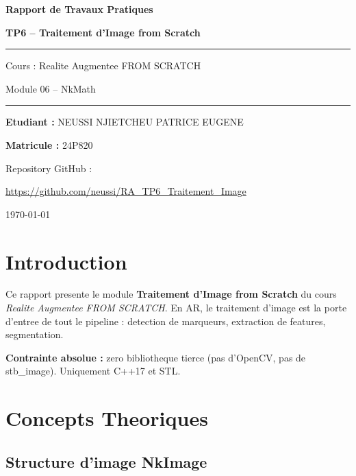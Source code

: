 \documentclass[12pt,a4paper]{article}
\begin{document}
\begin{titlepage}
    \centering
    \vspace*{2cm}
    {\huge\bfseries Rapport de Travaux Pratiques\par}
    \vspace{1cm}
    {\LARGE\bfseries\color{codeblue} TP6 -- Traitement d'Image from Scratch\par}
    \vspace{1.5cm}
    \rule{\linewidth}{0.5pt}\vspace{0.5cm}
    {\large Cours : Realite Augmentee FROM SCRATCH\par}
    {\large Module 06 -- NkMath\par}
    \vspace{0.5cm}\rule{\linewidth}{0.5pt}
    \vspace{2cm}
    {\large\textbf{Etudiant :} NEUSSI NJIETCHEU PATRICE EUGENE\par}
    {\large\textbf{Matricule :} 24P820\par}
    \vspace{2cm}
    {\large Repository GitHub :\par}
    \href{https://github.com/neussi/RA_TP6_Traitement_Image}{https://github.com/neussi/RA\_TP6\_Traitement\_Image}
    \vfill
    {\large \today\par}
\end{titlepage}

\tableofcontents
\newpage

\section{Introduction}

Ce rapport presente le module \textbf{Traitement d'Image from Scratch} du cours
\textit{Realite Augmentee FROM SCRATCH}. En AR, le traitement d'image est la porte
d'entree de tout le pipeline : detection de marqueurs, extraction de features, segmentation.

\textbf{Contrainte absolue :} zero bibliotheque tierce (pas d'OpenCV, pas de stb\_image).
Uniquement C++17 et STL.

\section{Concepts Theoriques}

\subsection{Structure d'image NkImage}
\end{document}
